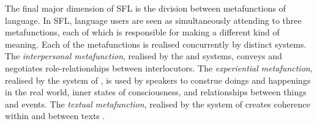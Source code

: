 The final major dimension of \gls{SFL} is the division between metafunctions of language. In \gls{SFL}, language users are seen as simultaneously attending to three metafunctions, each of which is responsible for making a different kind of meaning. Each of the metafunctions is realised concurrently by distinct  systems. The \emph{interpersonal metafunction}, realised by the  and  systems, conveys and negotiates role-relationships between interlocutors. The \emph{experiential metafunction}, realised by the system of , is used by speakers to construe doings and happenings in the real world, inner states of consciousness, and relationships between things and events. The \emph{textual metafunction}, realised by the system of  creates coherence within and between texts \cite{eggins_introduction_2004}.





